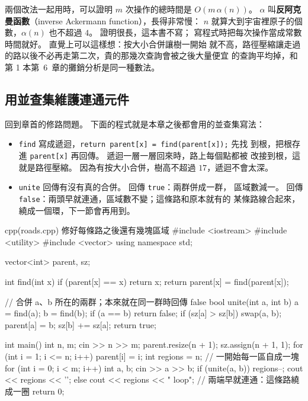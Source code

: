 兩個改法一起用時，可以證明 $m$ 次操作的總時間是 $O(m \, \alpha(n))$。
$\alpha$ 叫\textbf{反阿克曼函數}（inverse Ackermann function），長得非常慢：
$n$ 就算大到宇宙裡原子的個數，$\alpha(n)$ 也不超過 $4$。 證明很長，這本書不寫；
寫程式時把每次操作當成常數時間就好。 直覺上可以這樣想：按大小合併讓樹一開始
就不高，路徑壓縮讓走過的路以後不必再走第二次，貴的那幾次查詢會被之後大量便宜
的查詢平均掉，和第 1 本第~6~章的攤銷分析是同一種數法。

\subsection{用並查集維護連通元件}

回到章首的修路問題。 下面的程式就是本章之後都會用的並查集寫法：

\begin{itemize}
\item \texttt{find} 寫成遞迴，\texttt{return parent[x] = find(parent[x]);} 先找
到根，把根存進 \texttt{parent[x]} 再回傳。 遞迴一層一層回來時，路上每個點都被
改接到根，這就是路徑壓縮。 因為有按大小合併，樹高不超過 $17$，遞迴不會太深。
\item \texttt{unite} 回傳有沒有真的合併。 回傳 \texttt{true}：兩群併成一群，
區域數減一。 回傳 \texttt{false}：兩頭早就連通，區域數不變；這條路和原本就有的
某條路線合起來，繞成一個環，下一節會再用到。
\end{itemize}

\begin{example}[label=ex:repair-roads]{cpp}{(roads.cpp) 修好每條路之後還有幾塊區域}
#include <iostream>
#include <utility>
#include <vector>
using namespace std;

vector<int> parent, sz;

int find(int x) {
    if (parent[x] == x) {
        return x;
    }
    return parent[x] = find(parent[x]);
}

// 合併 a、b 所在的兩群；本來就在同一群時回傳 false
bool unite(int a, int b) {
    a = find(a);
    b = find(b);
    if (a == b) {
        return false;
    }
    if (sz[a] > sz[b]) {
        swap(a, b);
    }
    parent[a] = b;
    sz[b] += sz[a];
    return true;
}

int main() {
    int n, m;
    cin >> n >> m;
    parent.resize(n + 1);
    sz.assign(n + 1, 1);
    for (int i = 1; i <= n; i++) {
        parent[i] = i;
    }
    int regions = n;                       // 一開始每一區自成一塊
    for (int i = 0; i < m; i++) {
        int a, b;
        cin >> a >> b;
        if (unite(a, b)) {
            regions--;
            cout << regions << '\n';
        } else {
            cout << regions << " loop\n";  // 兩端早就連通：這條路繞成一圈
        }
    }
    return 0;
}
\end{example}

